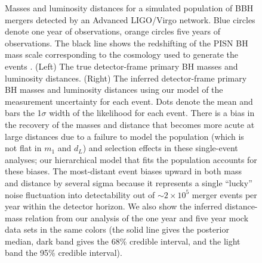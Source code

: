 \documentclass[modern]{aastex62}
\begin{document}
\begin{figure}
%
  \caption{\label{fig:m1-dL} Masses and luminosity distances for a simulated population of \ac{BBH} mergers detected by an Advanced LIGO/Virgo network.
  Blue circles
  denote one year of observations, orange circles five
  years of observations. The black line shows the redshifting of the PISN
  \ac{BH} mass scale corresponding to the cosmology used to generate the events
  \citep[TT, TE, EE + lowP + lensing + ext]{Planck2016}.  (Left)
  The true detector-frame primary \ac{BH} masses and luminosity distances.   (Right) The inferred
  detector-frame primary \ac{BH} masses and luminosity distances using our model
  of the measurement uncertainty for each event. Dots denote the mean and
  bars the 1$\sigma$ width of the likelihood for each event.  There is a bias in
  the recovery of the masses and distance that becomes more acute at large
  distances due to a failure to model the population (which is not flat in $m_1$
  and $d_L$) and selection effects in these single-event analyses; our
  hierarchical model that fits the population accounts for these biases. The most-distant
  event biases upward in both mass and distance by several sigma because it
  represents a single ``lucky'' noise fluctuation into detectability out of
  $\sim 2 \times 10^5$ merger events per year within the detector horizon.  We
  also show the inferred distance-mass relation from our analysis of the one
  year and five year mock data sets in the same colors (the solid line gives the
  posterior median, dark band gives the 68\% credible interval, and the light
  band the 95\% credible interval).}
%
\end{figure}
\end{document}
